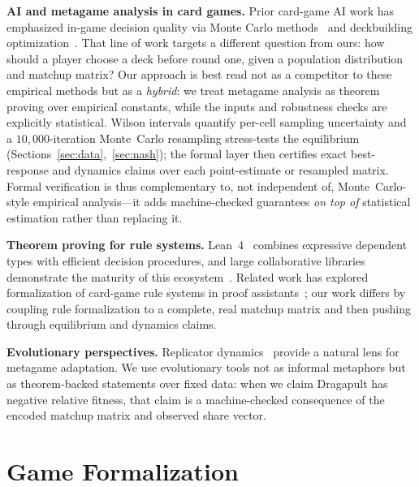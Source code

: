 \documentclass[journal]{IEEEtran}
\newif\ifhighlightchanges
\newcommand{\revised}[1]{\ifhighlightchanges\textcolor{blue!70!black}{#1}\else#1\fi}
\let\origsection\section
\renewcommand{\section}{\needspace{4\baselineskip}\origsection}
\begin{document}
\textbf{AI and metagame analysis in card games.}
Prior card-game AI work has emphasized in-game decision quality via Monte Carlo methods~\cite{cowling2012information,ward2009monte,santos2017monte,zhang2017deck} and deckbuilding optimization~\cite{bjorke2017deckbuilding,dockhorn2019hearthstone,kowalski2020summon}.
That line of work targets a different question from ours: how should a player choose a deck before round one, given a population distribution and matchup matrix?
Our approach is best read not as a competitor to these empirical methods but as a \revised{\emph{hybrid}: we treat metagame analysis as theorem proving over empirical constants, while the inputs and robustness checks are explicitly statistical.
Wilson intervals quantify per-cell sampling uncertainty and a $10{,}000$-iteration Monte~Carlo resampling stress-tests the equilibrium (Sections~\ref{sec:data},~\ref{sec:nash}); the formal layer then certifies exact best-response and dynamics claims over each point-estimate or resampled matrix.
Formal verification is thus complementary to, not independent of, Monte~Carlo-style empirical analysis---it adds machine-checked guarantees \emph{on top of} statistical estimation rather than replacing it.}

\textbf{Theorem proving for rule systems.}
Lean~4~\cite{moura2021lean} combines expressive dependent types with efficient decision procedures, and large collaborative libraries demonstrate the maturity of this ecosystem~\cite{gonthier2008four,Avigad2007,mathlib2020,hales2017kepler}.
Related work has explored formalization of card-game rule systems in proof assistants~\cite{li2023card}; our work differs by coupling rule formalization to a complete, real matchup matrix and then pushing through equilibrium and dynamics claims.

\textbf{Evolutionary perspectives.}
Replicator dynamics~\cite{smith1973logic,taylor1978evolutionary,weibull1997evolutionary} provide a natural lens for metagame adaptation.
We use evolutionary tools not as informal metaphors but as theorem-backed statements over fixed data: when we claim Dragapult has negative relative fitness, that claim is a machine-checked consequence of the encoded matchup matrix and observed share vector.



\section{Game Formalization}\label{sec:formalization}
\end{document}
